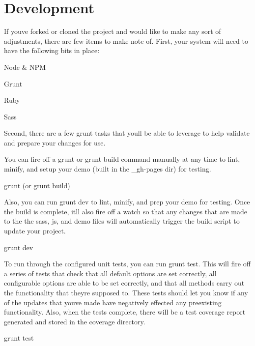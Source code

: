 \section*{Development }

If you\textquotesingle{}ve forked or cloned the project and would like to make any sort of adjustments, there are few items to make note of. First, your system will need to have the following bits in place\+:


\begin{DoxyItemize}
\item Node \& N\+PM
\item Grunt
\item Ruby
\item Sass
\end{DoxyItemize}

Second, there are a few grunt tasks that you\textquotesingle{}ll be able to leverage to help validate and prepare your changes for use.

You can fire off a {\ttfamily grunt} or {\ttfamily grunt build} command manually at any time to lint, minify, and setup your demo (built in the \+\_\+gh-\/pages dir) for testing.


\begin{DoxyCode}
grunt (or grunt build)
\end{DoxyCode}


Also, you can run {\ttfamily grunt dev} to lint, minify, and prep your demo for testing. Once the build is complete, it\textquotesingle{}ll also fire off a {\ttfamily watch} so that any changes that are made to the the sass, js, and demo files will automatically trigger the build script to update your project.


\begin{DoxyCode}
grunt dev
\end{DoxyCode}


To run through the configured unit tests, you can run {\ttfamily grunt test}. This will fire off a series of tests that check that all default options are set correctly, all configurable options are able to be set correctly, and that all methods carry out the functionality that they\textquotesingle{}re supposed to. These tests should let you know if any of the updates that you\textquotesingle{}ve made have negatively effected any preexisting functionality. Also, when the tests complete, there will be a test coverage report generated and stored in the {\ttfamily coverage} directory.


\begin{DoxyCode}
grunt test
\end{DoxyCode}


